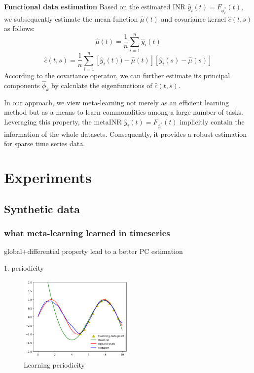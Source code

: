 \documentclass{article}
\begin{document}
\textbf{Functional data estimation}
Based on the estimated INR $\hat{y}_i(t)=F_{\phi^*_i}(t)$, we subsequently estimate the mean function $\hat{\mu}(t)$ and covariance kernel $\hat{c}(t,s)$ as follows:
$$
\hat{\mu}(t)= \frac{1}{n} \sum_{i=1}^n \hat{y}_i(t)
$$
$$
\hat{c}(t,s)= \frac{1}{n} \sum_{i=1}^n  [\hat{y}_i(t))-\hat{\mu}(t)] [\hat{y}_i(s)-\hat{\mu}(s) ]
$$
According to the covariance operator, we can further estimate its principal components $\hat{\phi}_k$ by calculate the eigenfunctions of $\hat{c}(t,s)$.

In our approach, we view meta-learning not merely as an efficient learning method but as a means to learn commonalities among a large number of tasks.
Leveraging this property, the metaINR $\hat{y}_i(t)=F_{\phi^*_i}(t)$ implicitly contain the information of the whole datasets.
Consequently, it provides a robust estimation for sparse time series data.

\section{Experiments}

\subsection{Synthetic data}

\subsubsection{what meta-learning learned in  timeseries}

global+differential property lead to a better PC estimation



1. periodicity
\begin{figure}
  \centering
  \includegraphics[width=0.5\textwidth]{learning_periodicity.png}
  \caption{Learning periodicity}
\end{figure}
\end{document}
